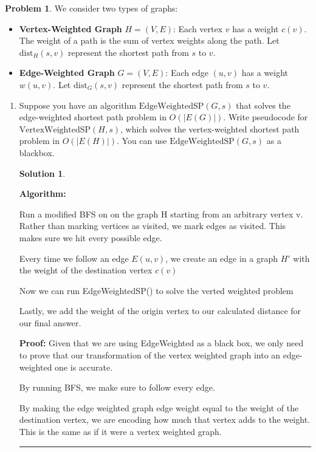\documentclass{article}
\theoremstyle{definition}
\newtheorem{problem}{Problem}
\def\fline{\rule{0.75\linewidth}{0.5pt}}
\newcommand{\finishline}{\begin{center}\fline\end{center}}
\newtheorem*{solution*}{Solution}
\newenvironment{solution}{\begin{solution*}}{{\finishline} \end{solution*}}
\begin{document}
\begin{problem}
    We consider two types of graphs:
\begin{itemize}
    \item \textbf{Vertex-Weighted Graph} \( H = (V, E) \): Each vertex \( v \) has a weight \( c(v) \). The weight of a path is the sum of vertex weights along the path. Let \( \text{dist}_H(s, v) \) represent the shortest path from \( s \) to \( v \).
    \item \textbf{Edge-Weighted Graph} \( G = (V, E) \): Each edge \( (u, v) \) has a weight \( w(u, v) \). Let \( \text{dist}_G(s, v) \) represent the shortest path from \( s \) to \( v \).
\end{itemize}

\begin{enumerate}
    \item[a)]


Suppose you have an algorithm \( \text{EdgeWeightedSP}(G, s) \) that solves the edge-weighted shortest path problem in \( O(|E(G)|) \). Write pseudocode for \( \text{VertexWeightedSP}(H, s) \), which solves the vertex-weighted shortest path problem in \( O(|E(H)|) \). You can use \(\text{EdgeWeightedSP}(G, s) \) as a blackbox.


\begin{solution}
    \

    \textbf{Algorithm: }
    \
    
    Run a modified BFS on on the graph H starting from an arbitrary vertex v. Rather than marking vertices as visited, we mark edges as visited. This makes sure we hit every possible edge.

    Every time we follow an edge $E(u,v)$, we create an edge in a graph $H'$ with the weight of the destination vertex $c(v)$

    Now we can run EdgeWeightedSP() to solve the verted weighted problem 

    Lastly, we add the weight of the origin vertex to our calculated distance for our final answer.
    \

    \textbf{Proof:}
    Given that we are using EdgeWeighted as a black box, we only need to prove that our transformation of the vertex weighted graph into an edge-weighted one is accurate.
    \

    By running BFS, we make sure to follow every edge.

    By making the edge weighted graph edge weight equal to the weight of the destination vertex, we are encoding how much that vertex adds to the weight. This is the same as if it were a vertex weighted graph. 


\end{solution}
\end{enumerate}
\end{problem}
\end{document}
